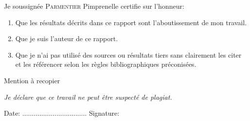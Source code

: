 \documentclass[11pt,a4paper]{article}
\theoremstyle{definition}
\theoremstyle{remark}
\theoremstyle{remark}
\def \stgs {stream graphs}
\def \stgms {stream graphs multicouches}
\begin{document}
Je soussignée \textsc{Parmentier} Pimprenelle certifie sur l’honneur:

\begin{enumerate}
    \item Que les résultats décrits dans ce rapport sont l’aboutissement de mon travail.
    \item Que je suis l’auteur de ce rapport.
    \item Que je n’ai pas utilisé des sources ou résultats tiers sans clairement les citer et les
référencer selon les règles bibliographiques préconisées.
\end{enumerate}

Mention à recopier

\textit{Je déclare que ce travail ne peut être suspecté de plagiat.}

\vspace{2cm}
Date: .................................. \hspace{2cm} Signature:

\newpage

\begin{abstract}

Ce rapport de stage traite d'un nouvel objet permettant d'étudier des graphes complexes dépendants du temps : les \textbf{\stgms{}}. 

Dans un premier lieu, nous faisons un état de l'art sur les formalismes existants pour traiter de graphes complexes et de graphes temporels. Nous présentons ainsi les graphes multicouches et les \stgs{} qui nous servent à construire les \stgms{}. 

Dans un second temps, nous donnons une définition formelle des \stgms{}, et nous montrons en quoi ce nouvel objet est une généralisation des objets existants. Puis nous définissons des mesures permettant d'étudier les \stgms{}, qui prennent en compte l'aspect à la fois multicouches et temporel.

Nous présentons ensuite la bibliothèque Python con\c{c}ue pour traiter ce type d'objet, ainsi qu'un exemple d'utilisation avec un jeu de données temporel multicouches.

Enfin, nous donnons un ensemble de pistes que nous pourrons explorer pour la suite du stage.

\end{abstract}



\end{document}
